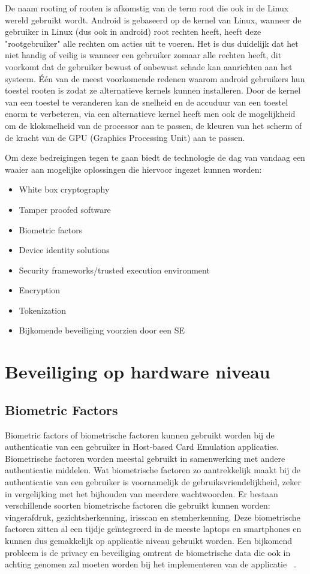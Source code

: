 De naam rooting of rooten is afkomstig van de term root die ook in de Linux wereld gebruikt wordt. Android is gebaseerd op de kernel van Linux, wanneer de gebruiker in Linux (dus ook in android) root rechten heeft, heeft deze "rootgebruiker" alle rechten om acties uit te voeren. Het is dus duidelijk dat het niet handig of veilig is wanneer een gebruiker zomaar alle rechten heeft, dit voorkomt dat de gebruiker bewust of onbewust schade kan aanrichten aan het systeem. Één van de meest voorkomende redenen waarom android gebruikers hun toestel rooten is zodat ze alternatieve kernels kunnen installeren. Door de kernel van een toestel te veranderen kan de snelheid en de accuduur van een toestel enorm te verbeteren, via een alternatieve kernel heeft men ook de mogelijkheid om de kloksnelheid van de processor aan te passen, de kleuren van het scherm of de kracht van de GPU (Graphics Processing Unit) aan te passen.
 
Om deze bedreigingen tegen te gaan biedt de technologie de dag van vandaag een waaier aan mogelijke oplossingen die hiervoor ingezet kunnen worden:

\begin{itemize}
	\item White box cryptography
	\item Tamper proofed software
	\item Biometric factors
	\item Device identity solutions
	\item Security frameworks/trusted execution environment
	\item Encryption
	\item Tokenization
	\item Bijkomende beveiliging voorzien door een SE
\end{itemize}

\section{Beveiliging op hardware niveau}

\subsection{Biometric Factors}
Biometric factors of biometrische factoren kunnen gebruikt worden bij de authenticatie van een gebruiker in Host-based Card Emulation applicaties. Biometrische factoren worden meestal gebruikt in samenwerking met andere authenticatie middelen. Wat biometrische factoren zo aantrekkelijk maakt bij de authenticatie van een gebruiker is voornamelijk de gebruiksvriendelijkheid, zeker in vergelijking met het bijhouden van meerdere wachtwoorden. Er bestaan verschillende soorten biometrische factoren die gebruikt kunnen worden: vingerafdruk, gezichtsherkenning, irisscan en stemherkenning. Deze biometrische factoren zitten al een tijdje geïntegreerd in de meeste laptops en smartphones en kunnen dus gemakkelijk op applicatie niveau gebruikt worden. Een bijkomend probleem is de privacy en beveiliging omtrent de biometrische data die ook in achting genomen zal moeten worden bij het implementeren van de applicatie ~\autocite{SCA2014}.

